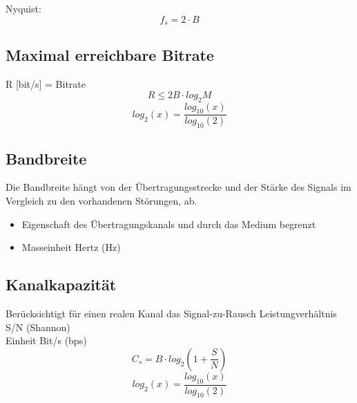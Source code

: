 {Nyquist:}
$$ f_s = 2 \cdot B$$

\subsection{Maximal erreichbare Bitrate}{
R [bit/s] = Bitrate \\
$$ R \leq 2B \cdot log_2{M} $$
$$ log_2(x) = \frac{log_{10}(x)}{log_{10}(2)} $$
}



\subsection{Bandbreite}{
    Die Bandbreite hängt von der Übertragungsstrecke und der Stärke des Signals im
    Vergleich zu den vorhandenen Störungen, ab.
    \begin{itemize}[noitemsep]
        \item Eigenschaft des Übertragungskanals und durch das Medium begrenzt
        \item Masseinheit Hertz (Hz)
    \end{itemize}
}

\subsection{Kanalkapazität}{
    Berücksichtigt für einen realen Kanal das Signal-zu-Rausch Leistungverhältnis S/N (Shannon)
    \\ Einheit Bit/s (bps)
    $$ C_s = B \cdot log_2(1 + \frac{S}{N})$$
    $$ log_2(x) = \frac{log_{10}(x)}{log_{10}(2)} $$
}
